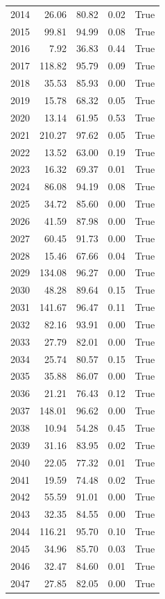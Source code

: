 \begin{longtable}{rrrrr}
2014 & 26.06 & 80.82 & 0.02 & True \\
2015 & 99.81 & 94.99 & 0.08 & True \\
2016 & 7.92 & 36.83 & 0.44 & True \\
2017 & 118.82 & 95.79 & 0.09 & True \\
2018 & 35.53 & 85.93 & 0.00 & True \\
2019 & 15.78 & 68.32 & 0.05 & True \\
2020 & 13.14 & 61.95 & 0.53 & True \\
2021 & 210.27 & 97.62 & 0.05 & True \\
2022 & 13.52 & 63.00 & 0.19 & True \\
2023 & 16.32 & 69.37 & 0.01 & True \\
2024 & 86.08 & 94.19 & 0.08 & True \\
2025 & 34.72 & 85.60 & 0.00 & True \\
2026 & 41.59 & 87.98 & 0.00 & True \\
2027 & 60.45 & 91.73 & 0.00 & True \\
2028 & 15.46 & 67.66 & 0.04 & True \\
2029 & 134.08 & 96.27 & 0.00 & True \\
2030 & 48.28 & 89.64 & 0.15 & True \\
2031 & 141.67 & 96.47 & 0.11 & True \\
2032 & 82.16 & 93.91 & 0.00 & True \\
2033 & 27.79 & 82.01 & 0.00 & True \\
2034 & 25.74 & 80.57 & 0.15 & True \\
2035 & 35.88 & 86.07 & 0.00 & True \\
2036 & 21.21 & 76.43 & 0.12 & True \\
2037 & 148.01 & 96.62 & 0.00 & True \\
2038 & 10.94 & 54.28 & 0.45 & True \\
2039 & 31.16 & 83.95 & 0.02 & True \\
2040 & 22.05 & 77.32 & 0.01 & True \\
2041 & 19.59 & 74.48 & 0.02 & True \\
2042 & 55.59 & 91.01 & 0.00 & True \\
2043 & 32.35 & 84.55 & 0.00 & True \\
2044 & 116.21 & 95.70 & 0.10 & True \\
2045 & 34.96 & 85.70 & 0.03 & True \\
2046 & 32.47 & 84.60 & 0.01 & True \\
2047 & 27.85 & 82.05 & 0.00 & True \\

\end{longtable}
